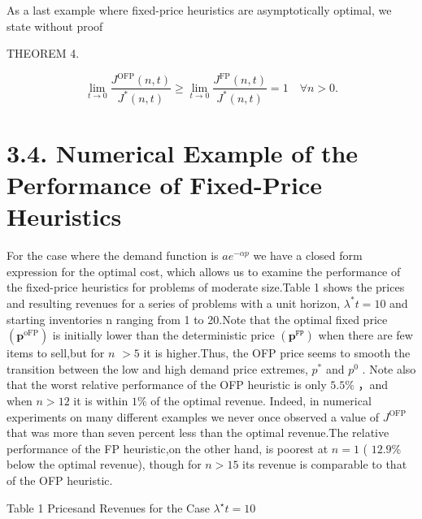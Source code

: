 As a last example where fixed-price heuristics are asymptotically
optimal, we state without proof

THEOREM 4.

\[
\operatorname* { l i m } _ { t \to 0 } \frac { J ^ { \mathrm { O F P } } ( n , t ) } { J ^ { * } ( n , t ) } \geq \operatorname* { l i m } _ { t \to 0 } \frac { J ^ { \mathrm { F P } } ( n , t ) } { J ^ { * } ( n , t ) } = 1 \quad \forall n > 0 .
\]

\section{3.4. Numerical Example of the Performance of Fixed-Price
Heuristics}\label{numerical-example-of-the-performance-of-fixed-price-heuristics}

For the case where the demand function is \(a e ^ { - \alpha p }\) we
have a closed form expression for the optimal cost, which allows us to
examine the performance of the fixed-price heuristics for problems of
moderate size.Table 1 shows the prices and resulting revenues for a
series of problems with a unit horizon, \(\lambda ^ { * } t = 1 0\) and
starting inventories n ranging from 1 to 20.Note that the optimal fixed
price \(( \boldsymbol { p } ^ { \mathrm { o F P } } )\) is initially
lower than the deterministic price
\(( \boldsymbol { p } ^ { \mathtt { F P } } )\) when there are few items
to sell,but for \(n\) \(> 5\) it is higher.Thus, the OFP price seems to
smooth the transition between the low and high demand price extremes,
\(p ^ { * }\) and \(p ^ { 0 }\) . Note also that the worst relative
performance of the OFP heuristic is only \(5 . 5 \%\) ，and when
\(n > 1 2\) it is within \(1 \%\) of the optimal revenue. Indeed, in
numerical experiments on many different examples we never once observed
a value of \(J ^ { \mathrm { O F P } }\) that was more than seven
percent less than the optimal revenue.The relative performance of the FP
heuristic,on the other hand, is poorest at \(n = 1\) ( \(1 2 . 9 \%\)
below the optimal revenue), though for \(n > 1 5\) its revenue is
comparable to that of the OFP heuristic.

Table 1 Pricesand Revenues for the Case \(\lambda ^ { \star } t = 1 0\)


